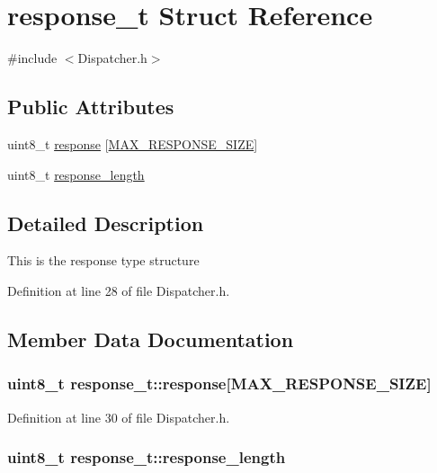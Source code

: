 \hypertarget{structresponse__t}{\section{response\-\_\-t \-Struct \-Reference}
\label{structresponse__t}
}


{\ttfamily \#include $<$\-Dispatcher.\-h$>$}

\subsection*{\-Public \-Attributes}
\begin{DoxyCompactItemize}
\item 
uint8\-\_\-t \hyperlink{structresponse__t_a2cc532437f164e1982a25e51aedcd09d}{response} \mbox{[}\hyperlink{_dispatcher_8h_a836f11ea44075aa0ac768c646e40adaa}{\-M\-A\-X\-\_\-\-R\-E\-S\-P\-O\-N\-S\-E\-\_\-\-S\-I\-Z\-E}\mbox{]}
\item 
uint8\-\_\-t \hyperlink{structresponse__t_aeaab0ceac7abfb8698b31a02f8f9bf36}{response\-\_\-length}
\end{DoxyCompactItemize}


\subsection{\-Detailed \-Description}
\-This is the response type structure 

\-Definition at line 28 of file \-Dispatcher.\-h.



\subsection{\-Member \-Data \-Documentation}
\hypertarget{structresponse__t_a2cc532437f164e1982a25e51aedcd09d}{
\subsubsection[{response}]{\setlength{\rightskip}{0pt plus 5cm}uint8\-\_\-t {\bf response\-\_\-t\-::response}\mbox{[}{\bf \-M\-A\-X\-\_\-\-R\-E\-S\-P\-O\-N\-S\-E\-\_\-\-S\-I\-Z\-E}\mbox{]}}}\label{structresponse__t_a2cc532437f164e1982a25e51aedcd09d}


\-Definition at line 30 of file \-Dispatcher.\-h.

\hypertarget{structresponse__t_aeaab0ceac7abfb8698b31a02f8f9bf36}{
\subsubsection[{response\-\_\-length}]{\setlength{\rightskip}{0pt plus 5cm}uint8\-\_\-t {\bf response\-\_\-t\-::response\-\_\-length}}}\label{structresponse__t_aeaab0ceac7abfb8698b31a02f8f9bf36}


